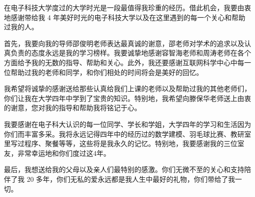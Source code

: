 
在电子科技大学度过的大学时光是一段最值得我珍重的经历。借此机会，我要由衷地感谢带给我 4 年美好时光的电子科技大学以及在这里遇到的每一个关心和帮助过我的人。

首先，我要向我的导师邵俊明老师表达最真诚的谢意，邵老师对学术的追求以及认真负责的态度永远是我的学习榜样。我要诚挚地感谢容智海老师和周涛老师在各个方面给予我的无数的指导、帮助和关心。此外，我还要感谢互联网科学中心中每一位帮助过我的老师和同学，和你们相处的时间将会是美好的回忆。

我希望将诚挚的感谢送给那些认真给我们上课的老师以及帮助过我的其他老师们，你们让我在大学四年中学到了宝贵的知识。特别地，我希望向滕保华老师送上由衷的谢意，您对我的指导和帮助我将铭记于心。

我要感谢在电子科大认识的每一位同学、学长和学姐，大学四年的学习和生活因为你们而丰富多采。我将永远记得四年中的经历过的数学建模、羽毛球比赛、教研室里写过程序、聚餐等等，这些将是我永久的记忆。特别地，我要感谢我的三位室友，非常幸运地和你们度过这4年。

最后，我想送给我的父母以及亲人们最特别的感激。你们无微不至的关心和支持陪伴了我 20 多年，你们无私的爱永远都是我人生中最好的礼物，你们带给了我一切。

